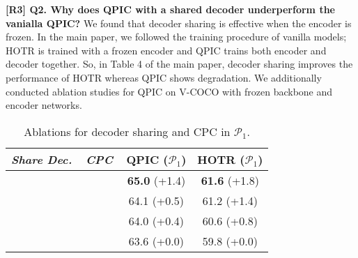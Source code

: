 \documentclass[10pt,twocolumn,letterpaper]{article}
\newcommand{\hjk}[1]{{\color{black}#1}}
\begin{document}
\hjk{
\noindent\textbf{[R3] Q2. Why does QPIC with a shared decoder underperform the vanialla QPIC?}\newline
We found that decoder sharing is effective when the encoder is frozen. 
In the main paper, we followed the training procedure of vanilla models; HOTR is trained with a frozen encoder and QPIC trains both encoder and decoder together. 
So, in Table 4 of the main paper, decoder sharing improves the performance of HOTR whereas QPIC shows degradation. 
We additionally conducted ablation studies for QPIC on V-COCO with frozen backbone and encoder networks. 
\vspace{-1.8mm}

\begin{table}[h]
    \centering
\footnotesize
\captionsetup{aboveskip=2pt}
    \begin{tabular}{c c  c  c}
         \toprule
          
\multirow{1}{*}{\textit{Share Dec.}} &
         \multirow{1}{*}{$\  $\textit{CPC}$\  $}& 
         \multirow{1}{*}{\textbf{QPIC} ($\mathcal{P}_1$)} &
        
         \multirow{1}{*}{\textbf{HOTR} ($\mathcal{P}_1$)} 
         
         \\
         
         \midrule    
      
         
      
         
         
         \checkmark &\checkmark &
         \textbf{65.0} \color{blue}(+1.4)&\textbf{61.6 } \color{blue}(+1.8) \\
         
        
          &\checkmark & 
         64.1 \color{blue}(+0.5) & 61.2 \color{blue}(+1.4) \\
         
        
         \checkmark  & &
         64.0 \color{blue}(+0.4)&60.6 \color{blue}(+0.8)
         \\
         
           & &
         63.6 \color{blue}(+0.0)&59.8 \color{blue}(+0.0)
         \\
         
        
         
         \bottomrule
    \end{tabular}
    \caption{
Ablations for decoder sharing and CPC in $\mathcal{P}_1$.}
    \label{table:abl_rebuttal}
\end{table}









}
\end{document}
